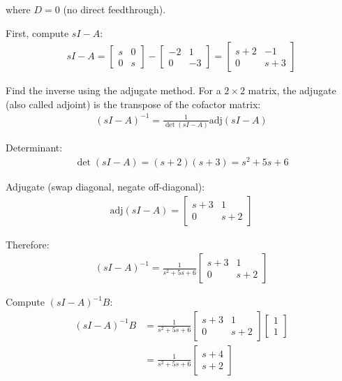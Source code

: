 \documentclass[11pt,a4paper]{article}
\begin{document}
where $D = 0$ (no direct feedthrough).

First, compute $sI - A$:
\begin{align}
sI - A = \begin{bmatrix} s & 0 \\ 0 & s \end{bmatrix} - \begin{bmatrix} -2 & 1 \\ 0 & -3 \end{bmatrix} = \begin{bmatrix} s+2 & -1 \\ 0 & s+3 \end{bmatrix}
\end{align}

Find the inverse using the adjugate method. For a $2 \times 2$ matrix, the adjugate (also called adjoint) is the transpose of the cofactor matrix:
\begin{align}
(sI-A)^{-1} = \frac{1}{\det(sI-A)}\text{adj}(sI-A)
\end{align}

Determinant:
\begin{align}
\det(sI-A) = (s+2)(s+3) = s^2 + 5s + 6
\end{align}

Adjugate (swap diagonal, negate off-diagonal):
\begin{align}
\text{adj}(sI-A) = \begin{bmatrix} s+3 & 1 \\ 0 & s+2 \end{bmatrix}
\end{align}

Therefore:
\begin{align}
(sI-A)^{-1} = \frac{1}{s^2+5s+6}\begin{bmatrix} s+3 & 1 \\ 0 & s+2 \end{bmatrix}
\end{align}

Compute $(sI-A)^{-1}B$:
\begin{align}
(sI-A)^{-1}B &= \frac{1}{s^2+5s+6}\begin{bmatrix} s+3 & 1 \\ 0 & s+2 \end{bmatrix}\begin{bmatrix} 1 \\ 1 \end{bmatrix} \\
&= \frac{1}{s^2+5s+6}\begin{bmatrix} s+4 \\ s+2 \end{bmatrix}
\end{align}
\end{document}
